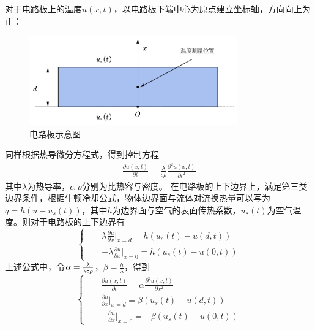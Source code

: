 \documentclass[withoutpreface,bwprint]{cumcmthesis} %
\begin{document}
	对于电路板上的温度$u(x,t)$，以电路板下端中心为原点建立坐标轴，方向向上为正：
	\begin{figure}[H]
		\centering
		\includegraphics[width=0.8\textwidth]{电路板示意图.png}
		\caption{电路板示意图}\label{电路板示意图}
	\end{figure}
	同样根据热导微分方程式，得到控制方程
	\begin{align}
	\frac{\partial u(x,t)}{\partial t}=\frac{\lambda}{c\rho}\frac{\partial^2u(x,t)}{\partial t^2}
	\end{align}
	其中$\lambda$为热导率，$c,\rho$分别为比热容与密度。
	在电路板的上下边界上，满足第三类边界条件，根据牛顿冷却公式，物体边界面与流体对流换热量可以写为$q=h(u-u_s(t))$，其中$h$为边界面与空气的表面传热系数，$u_s(t)$为空气温度。则对于电路板的上下边界有
	\begin{equation}
	\left\{
	\begin{array}{rcl}
	
	&&\lambda\frac{\partial u}{\partial x}|_{x=d}=h(u_s(t)-u(d,t)) \\
	&&-\lambda\frac{\partial u}{\partial x}|_{x=0}=h(u_s(t)-u(0,t)) 
	
	\end{array} \right.
	\end{equation}
	上述公式中，令$\alpha=\frac{\lambda}{\c\rho}$，$\beta=\frac{h}{\lambda}$，得到
	\begin{equation}
	\left\{
	\begin{array}{rcl}
	&&\frac{\partial u(x,t)}{\partial t}=\alpha\frac{\partial^2u(x,t)}{\partial x^2}  \\
	&&\frac{\partial u}{\partial x}|_{x=d}=\beta(u_s(t)-u(d,t))  \\
	&&-\frac{\partial u}{\partial x}|_{x=0}=-\beta(u_s(t)-u(0,t))  
	\end{array} \right.
	\label{lfc}
	\end{equation}
\end{document}
